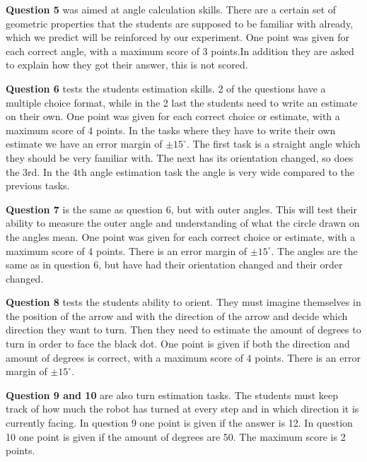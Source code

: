 \bigskip\noindent
\textbf{Question 5} was aimed at angle calculation skills. There are a certain set of geometric properties that the students are supposed to be familiar with already, which we predict will be reinforced by our experiment. One point was given for each correct angle, with a maximum score of 3 points.In addition they are asked to explain how they got their answer, this is not scored.

\bigskip\noindent
\textbf{Question 6} tests the students estimation skills. 2 of the questions have a multiple choice format, while in the 2 last the students need to write an estimate on their own. One point was given for each correct choice or estimate, with a maximum score of 4 points. In the tasks where they have to write their own estimate we have an error margin of $\pm 15^{\circ}$. The first task is a straight angle which they should be very familiar with. The next has its orientation changed, so does the 3rd. In the 4th angle estimation task the angle is very wide compared to the previous tasks. 

\bigskip\noindent
\textbf{Question 7} is the same as question 6, but with outer angles. This will test their ability to measure the outer angle and understanding of what the circle drawn on the angles mean. One point was given for each correct choice or estimate, with a maximum score of 4 points. There is an error margin of $\pm 15^{\circ}$. The angles are the same as in question 6, but have had their orientation changed and their order changed. 

\bigskip\noindent
\textbf{Question 8} tests the students ability to orient. They must imagine themselves in the position of the arrow and with the direction of the arrow and decide which direction they want to turn. Then they need to estimate the amount of degrees to turn in order to face the black dot. One point is given if both the direction and amount of degrees is correct, with a maximum score of 4 points. There is an error margin of $\pm 15^{\circ}$. 

\bigskip\noindent
\textbf{Question 9 and 10} are also turn estimation tasks. The students must keep track of how much the robot has turned at every step and in which direction it is currently facing. In question 9 one point is given if the answer is 12. In question 10 one point is given if the amount of degrees are 50. The maximum score is 2 points.

